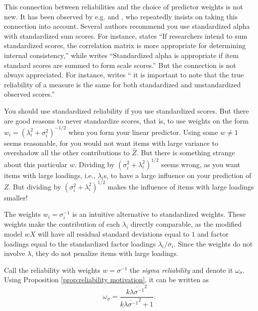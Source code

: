 \documentclass[twoside]{article}
\begin{document}
This connection between reliabilities and the choice of predictor
weights is not new. It has been observed by e.g. \citet[][p. 112]{Joreskog1971-nn} and \citet{McNeish2018-vu}, who repeatedly insists on taking this connection into account. Several authors recommend you use standardized alpha with standardized sum scores. For instance, \citet[][p. 451]{Falk2011-ae} states \enquote{If researchers intend to sum
standardized scores, the correlation matrix is more appropriate for determining internal consistency,} while \citet[][p. 99]{Cortina1993-aq} writes \enquote{Standardized alpha is appropriate if item standard scores are summed to form scale scores.} But the connection is not always appreciated. For instance, \citet[][p.348]{Osburn2000-jd} writes
\enquote{\textelp{} it is important to note that the true reliability of a measure is the same for both standardized and unstandardized observed scores.}

You should use standardized reliability if you use standardized scores. But there are good reasons to never standardize scores, that is, to use weights on the form $w_{i}=(\lambda_{i}^{2}+\sigma_{i}^{2})^{-1/2}$ when you form your linear predictor.
Using some $w\ne1$ seems reasonable, for you would not want items
with large variance to overshadow all the other contributions to $\hat{Z}$.
But there is something strange about this particular $w$. Dividing by $(\sigma_{i}^{2}+\lambda_{i}^{2})^{1/2}$
seems wrong, as you want items with large loadings, i.e., $\lambda_{i}$s, to have a large
influence on your prediction of $Z$. But dividing by $(\sigma_{i}^{2}+\lambda_{i}^{2})^{1/2}$
makes the influence of items with large loadings smaller!

The weights $w_i=\sigma_{i}^{-1}$ is an intuitive alternative to standardized weights. These weights make the contribution of each $\lambda_i$ directly comparable, as the modified model $wX$ will have all residual standard deviations equal to $1$ and factor loadings equal to the standardized factor loadings $\lambda_i/\sigma_i$. Since the weights do not involve $\lambda$, they do not penalize items with large loadings. 

Call the reliability with weights $w=\sigma^{-1}$ the \textit{sigma reliability} and denote it $\omega_\sigma$. Using Proposition \ref{prop:reliability motivation}, it can be written as
\begin{equation}
\omega_\sigma=\frac{k\overline{\lambda\sigma^{-1}}^{2}}{k\overline{\lambda\sigma^{-1}}^{2}+1}.\label{eq:Sigma-standardized reliability}
\end{equation}
\end{document}
